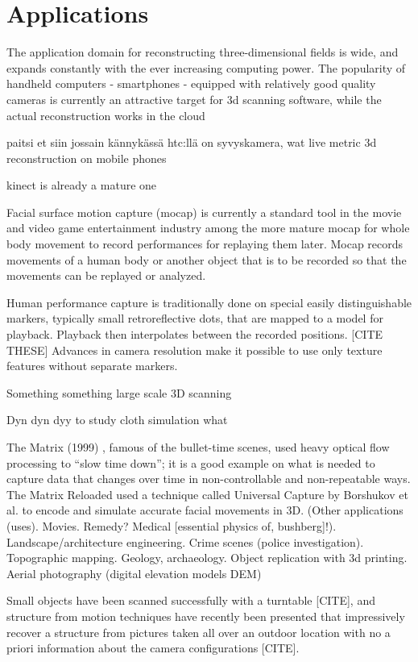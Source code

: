\section{Applications}

The application domain for reconstructing three-dimensional fields is wide, and expands constantly with the ever increasing computing power. The popularity of handheld computers - smartphones - equipped with relatively good quality cameras is currently an attractive target for 3d scanning software, while the actual reconstruction works in the cloud

paitsi et siin jossain kännykässä htc:llä on syvyskamera, wat
live metric 3d reconstruction on mobile phones

kinect is already a mature one



Facial surface motion capture (mocap) is currently a standard tool in the movie and video game entertainment industry among the more mature mocap for whole body movement to record performances for replaying them later.
Mocap records movements of a human body or another object that is to be recorded so that the movements can be replayed or analyzed.

Human performance capture is traditionally done on special easily distinguishable markers, typically small retroreflective dots, that are mapped to a model for playback. Playback then interpolates between the recorded positions. [CITE THESE] Advances in camera resolution make it possible to use only texture features without separate markers.

Something something large scale 3D scanning 

Dyn dyn dyy to study cloth simulation what

The Matrix (1999) \cite{wachowski99matrix}, famous of the bullet-time scenes, used heavy optical flow processing to ``slow time down''; it is a good example on what is needed to capture data that changes over time in non-controllable and non-repeatable ways. The Matrix Reloaded \cite{wachowski03reloaded} used a technique called Universal Capture by Borshukov et al. \cite{borshukov05universal} to encode and simulate accurate facial movements in 3D.
(Other applications (uses). Movies. Remedy? Medical [essential physics of, bushberg]!). Landscape/architecture engineering. Crime scenes (police investigation). Topographic mapping. Geology, archaeology. Object replication with 3d printing. Aerial photography (digital elevation models DEM)

Small objects have been scanned successfully with a turntable [CITE], and structure from motion techniques have recently been presented that impressively recover a structure from pictures taken all over an outdoor location with no a priori information about the camera configurations [CITE].

